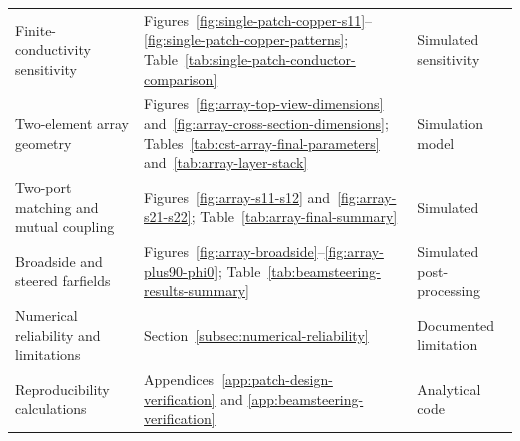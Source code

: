 \begin{longtable}{@{}
>{\raggedright\arraybackslash}p{}
>{\raggedright\arraybackslash}p{}
>{\raggedright\arraybackslash}p{}
@{}}
Finite-conductivity sensitivity &
Figures~\ref{fig:single-patch-copper-s11}--\ref{fig:single-patch-copper-patterns};
Table~\ref{tab:single-patch-conductor-comparison} &
Simulated sensitivity \\

Two-element array geometry &
Figures~\ref{fig:array-top-view-dimensions} and~\ref{fig:array-cross-section-dimensions};
Tables~\ref{tab:cst-array-final-parameters} and~\ref{tab:array-layer-stack} &
Simulation model \\

Two-port matching and mutual coupling &
Figures~\ref{fig:array-s11-s12} and~\ref{fig:array-s21-s22};
Table~\ref{tab:array-final-summary} &
Simulated \\

Broadside and steered farfields &
Figures~\ref{fig:array-broadside}--\ref{fig:array-plus90-phi0};
Table~\ref{tab:beamsteering-results-summary} &
Simulated post-processing \\

Numerical reliability and limitations &
Section~\ref{subsec:numerical-reliability} &
Documented limitation \\

Reproducibility calculations &
Appendices~\ref{app:patch-design-verification} and
\ref{app:beamsteering-verification} &
Analytical code \\

\bottomrule
\end{longtable}
